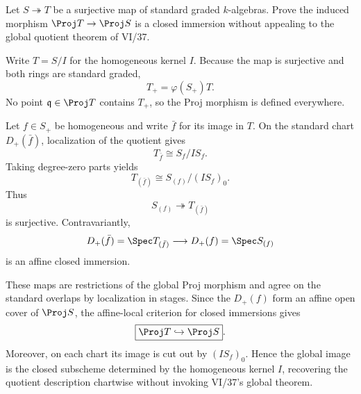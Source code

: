 \begin{problem}\label{prob:vi38-03}
Let \(S\twoheadrightarrow T\) be a surjective map of standard graded \(k\)-algebras.  Prove the induced morphism \(\Proj T\to\Proj S\) is a closed immersion without appealing to the global quotient theorem of VI/37.
\end{problem}

\ifdefined\FullProblemDossiers
\begin{solution}
Write \(T=S/I\) for the homogeneous kernel \(I\).  Because the map is surjective and
both rings are standard graded,
\[
T_+=\varphi(S_+)T.
\]
No point \(\mathfrak q\in\Proj T\) contains \(T_+\), so the Proj morphism is defined
everywhere.

Let \(f\in S_+\) be homogeneous and write \(\bar f\) for its image in \(T\).  On the
standard chart \(D_+(\bar f)\), localization of the quotient gives
\[
T_{\bar f}\cong S_f/IS_f.
\]
Taking degree-zero parts yields
\[
T_{(\bar f)}
\cong
S_{(f)}/(IS_f)_0.
\]
Thus
\[
S_{(f)}\twoheadrightarrow T_{(\bar f)}
\]
is surjective.  Contravariantly,
\[
D_+(\bar f)=\Spec T_{(\bar f)}
\longrightarrow
D_+(f)=\Spec S_{(f)}
\]
is an affine closed immersion.

These maps are restrictions of the global Proj morphism and agree on the standard
overlaps by localization in stages. Since the \(D_+(f)\) form an affine open cover
of \(\Proj S\), the affine-local criterion for closed immersions gives
\[
\boxed{\Proj T\hookrightarrow\Proj S}.
\]
Moreover, on each chart its image is cut out by \((IS_f)_0\).  Hence the global
image is the closed subscheme determined by the homogeneous kernel \(I\), recovering
the quotient description chartwise without invoking VI/37's global theorem.
\end{solution}
\fi
